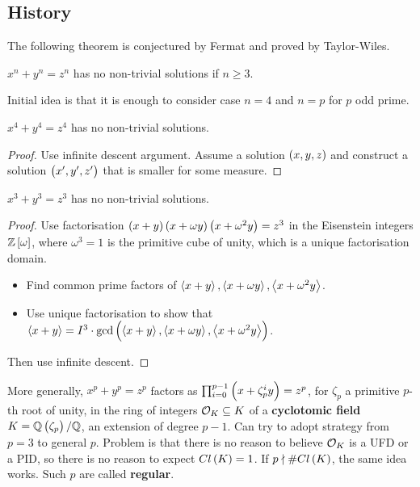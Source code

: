 \subsection{History}

The following theorem is conjectured by Fermat and proved by Taylor-Wiles.

\begin{theorem}
$ x^n + y^n = z^n $ has no non-trivial solutions if $ n \ge 3 $.
\end{theorem}

Initial idea is that it is enough to consider case $ n = 4 $ and $ n = p $ for $ p $ odd prime.

\begin{theorem}[Fermat]
$ x^4 + y^4 = z^4 $ has no non-trivial solutions.
\end{theorem}

\begin{proof}
Use infinite descent argument. Assume a solution $ \br{x, y, z} $ and construct a solution $ \br{x', y', z'} $ that is smaller for some measure.
\end{proof}

\begin{theorem}[Euler]
$ x^3 + y^3 = z^3 $ has no non-trivial solutions.
\end{theorem}

\begin{proof}
Use factorisation $ \br{x + y}\br{x + \omega y}\br{x + \omega^2y} = z^3 $ in the Eisenstein integers $ \Z\sbr{\omega} $, where $ \omega^3 = 1 $ is the primitive cube of unity, which is a unique factorisation domain.
\begin{itemize}
\item Find common prime factors of $ \left\langle x + y \right\rangle, \left\langle x + \omega y \right\rangle, \left\langle x + \omega^2y \right\rangle $.
\item Use unique factorisation to show that $ \abr{x + y} = I^3 \cdot \gcd\br{\abr{x + y}, \abr{x + \omega y}, \abr{x + \omega^2y}} $.
\end{itemize}
Then use infinite descent.
\end{proof}

More generally, $ x^p + y^p = z^p $ factors as $ \prod_{i = 0}^{p - 1} \br{x + \zeta_p^iy} = z^p $, for $ \zeta_p $ a primitive $ p $-th root of unity, in the ring of integers $ \mathcal{O}_K \subseteq K $ of a \textbf{cyclotomic field} $ K = \Q\br{\zeta_p} / \Q $, an extension of degree $ p - 1 $. Can try to adopt strategy from $ p = 3 $ to general $ p $. Problem is that there is no reason to believe $ \mathcal{O}_K $ is a UFD or a PID, so there is no reason to expect $ Cl\br{K} = 1 $. If $ p \nmid \#Cl\br{K} $, the same idea works. Such $ p $ are called \textbf{regular}.

